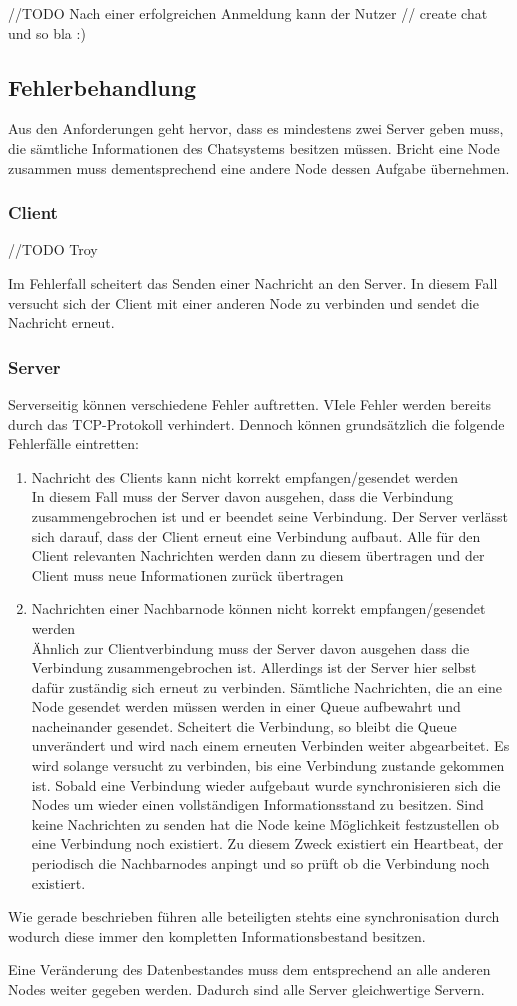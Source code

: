//TODO Nach einer erfolgreichen Anmeldung kann der Nutzer
// create chat und so bla :)


\subsection{Fehlerbehandlung}
Aus den Anforderungen geht hervor, dass es mindestens zwei Server geben muss, die sämtliche Informationen des Chatsystems besitzen müssen. Bricht eine Node zusammen muss dementsprechend eine andere Node dessen Aufgabe übernehmen.
\subsubsection{Client}
//TODO Troy

Im Fehlerfall scheitert das Senden einer Nachricht an den Server. In diesem Fall versucht sich der Client mit einer anderen Node zu verbinden und sendet die Nachricht erneut.

\subsubsection{Server}
Serverseitig können verschiedene Fehler auftretten. VIele Fehler werden bereits durch das TCP-Protokoll verhindert. Dennoch können grundsätzlich die folgende Fehlerfälle eintretten:
\begin{enumerate}
    \item Nachricht des Clients kann nicht korrekt empfangen/gesendet werden\\
        In diesem Fall muss der Server davon ausgehen, dass die Verbindung zusammengebrochen ist und er beendet seine Verbindung. Der Server verlässt sich darauf, dass der Client erneut eine Verbindung aufbaut. Alle für den Client relevanten Nachrichten werden dann zu diesem übertragen und der Client muss neue Informationen zurück übertragen
    \item Nachrichten einer Nachbarnode können nicht korrekt empfangen/gesendet werden\\
        Ähnlich zur Clientverbindung muss der Server davon ausgehen dass die Verbindung zusammengebrochen ist. Allerdings ist der Server hier selbst dafür zuständig sich erneut zu verbinden. Sämtliche Nachrichten, die an eine Node gesendet werden müssen werden in einer Queue aufbewahrt und nacheinander gesendet. Scheitert die Verbindung, so bleibt die Queue unverändert und wird nach einem erneuten Verbinden weiter abgearbeitet. Es wird solange versucht zu verbinden, bis eine Verbindung zustande gekommen ist. Sobald eine Verbindung wieder aufgebaut wurde synchronisieren sich die Nodes um wieder einen vollständigen Informationsstand zu besitzen.
        Sind keine Nachrichten zu senden hat die Node keine Möglichkeit festzustellen ob eine Verbindung noch existiert. Zu diesem Zweck existiert ein Heartbeat, der periodisch die Nachbarnodes anpingt und so prüft ob die Verbindung noch existiert.
\end{enumerate}
Wie gerade beschrieben führen alle beteiligten stehts eine synchronisation durch wodurch diese immer den kompletten Informationsbestand besitzen.

Eine Veränderung des Datenbestandes muss dem entsprechend an alle anderen Nodes weiter gegeben werden. Dadurch sind alle Server gleichwertige Servern.




